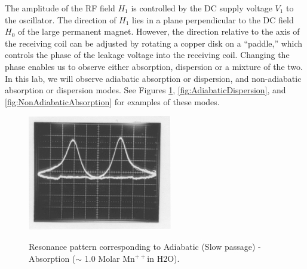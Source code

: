 \documentclass{../lab}
\begin{document}
The amplitude of the RF field $H_1$ is controlled by the DC supply voltage $V_1$ to the oscillator. The direction of $H_1$ lies in a plane perpendicular to the DC field $H_0$ of the large permanent magnet. However, the direction relative to the axis of the receiving coil can be adjusted by rotating a copper disk on a ``paddle,'' which controls the phase of the leakage voltage into the receiving coil. Changing the phase enables us to observe either absorption, dispersion or a mixture of the two. In this lab, we will observe adiabatic absorption or dispersion, and non-adiabatic absorption or dispersion modes. See Figures \ref{fig:AdiabaticAbsorption}, \ref{fig:AdiabaticDispersion}, and \ref{fig:NonAdiabaticAbsorption} for examples of these modes.

\begin{figure}[h]
\begin{minipage}[t]{0.31\textwidth}
    \href{http://experimentationlab.berkeley.edu/sites/default/files/images/NMR17.gif}{\includegraphics[width=\linewidth]{images/NMR17.png}}
    \caption{Resonance pattern corresponding to Adiabatic (Slow passage) - Absorption ($\sim$ 1.0 Molar Mn$^{++}$in H2O).}
    \label{fig:AdiabaticAbsorption}
\end{minipage}\hfill
\begin{minipage}[t]{0.31\textwidth}

\end{minipage}
\end{figure}
\end{document}

